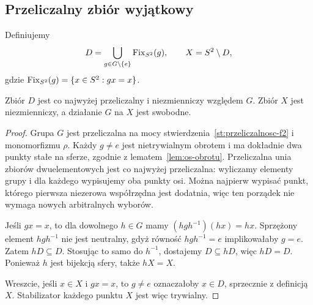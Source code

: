 \subsection{Przeliczalny zbiór wyjątkowy}
Definiujemy
\begin{equation}\label{eq:6-1}
 D=\bigcup_{g\in G\setminus\{e\}}\operatorname{Fix}_{S^2}(g),\qquad X=S^2\setminus D,
\end{equation}
gdzie $\operatorname{Fix}_{S^2}(g)=\{x\in S^2:gx=x\}$.
\begin{lemat}\label{lem:wyjatkowy}
Zbiór $D$ jest co najwyżej przeliczalny i niezmienniczy względem $G$. Zbiór $X$ jest niezmienniczy, a działanie $G$ na $X$ jest swobodne.
\end{lemat}
\begin{proof}
Grupa $G$ jest przeliczalna na mocy stwierdzenia~\ref{st:przeliczalnosc-f2} i monomorfizmu $\rho$. Każdy $g\ne e$ jest nietrywialnym obrotem i ma dokładnie dwa punkty stałe na sferze, zgodnie z lematem~\ref{lem:os-obrotu}. Przeliczalna unia zbiorów dwuelementowych jest co najwyżej przeliczalna: wyliczamy elementy grupy i dla każdego wypisujemy oba punkty osi. Można najpierw wypisać punkt, którego pierwsza niezerowa współrzędna jest dodatnia, więc ten porządek nie wymaga nowych arbitralnych wyborów.

Jeśli $gx=x$, to dla dowolnego $h\in G$ mamy $(hgh^{-1})(hx)=hx$. Sprzężony element $hgh^{-1}$ nie jest neutralny, gdyż równość $hgh^{-1}=e$ implikowałaby $g=e$. Zatem $hD\subseteq D$. Stosując to samo do $h^{-1}$, dostajemy $D\subseteq hD$, więc $hD=D$. Ponieważ $h$ jest bijekcją sfery, także $hX=X$.

Wreszcie, jeśli $x\in X$ i $gx=x$, to $g\ne e$ oznaczałoby $x\in D$, sprzecznie z definicją $X$. Stabilizator każdego punktu $X$ jest więc trywialny.
\end{proof}

